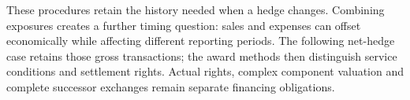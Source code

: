 









These procedures retain the history needed when a hedge changes. Combining exposures creates a further timing question: sales and expenses can offset economically while affecting different reporting periods. The following net-hedge case retains those gross transactions; the award methods then distinguish service conditions and settlement rights. Actual rights, complex component valuation and complete successor exchanges remain separate financing obligations.
